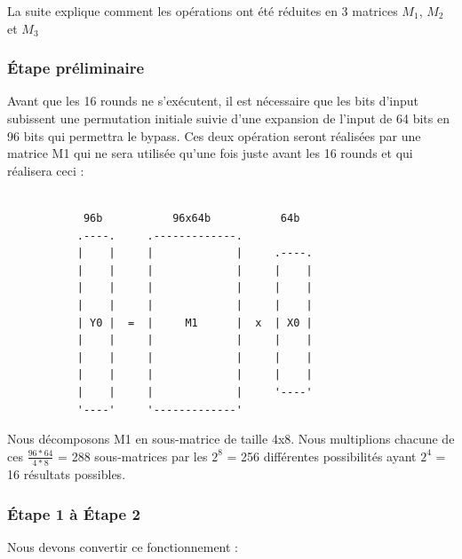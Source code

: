 \documentclass[a4paper,12pt]{article}
\begin{document}
La suite explique comment les opérations ont été réduites en 3 matrices $M_1$, $M_2$ et $M_3$

\subsubsection{Étape préliminaire}

Avant que les 16 rounds ne s'exécutent, il est nécessaire que les bits d'input subissent une permutation initiale suivie d'une expansion de l'input de 64 bits en 96 bits qui permettra le bypass.
Ces deux opération seront réalisées par une matrice M1 qui ne sera utilisée qu'une fois juste avant les 16 rounds et qui réalisera ceci :

\begin{Verbatim}[samepage=true]

            96b           96x64b           64b
           .----.     .-------------. 
           |    |     |             |     .----.
           |    |     |             |     |    |
           |    |     |             |     |    |
           |    |     |             |     |    |
           | Y0 |  =  |     M1      |  x  | X0 |
           |    |     |             |     |    |
           |    |     |             |     |    |
           |    |     |             |     |    |
           |    |     |             |     '----'
           '----'     '-------------'

\end{Verbatim}


Nous décomposons M1 en sous-matrice de taille 4x8. Nous multiplions chacune de ces $\frac{96*64}{4*8}$ = 288 sous-matrices par les $2^8$ = 256 différentes possibilités ayant $2^4$ = 16 résultats possibles.


\subsubsection{Étape 1 à Étape 2}

Nous devons convertir ce fonctionnement :
\end{document}
